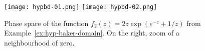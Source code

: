 \documentclass[a4paper, 12pt, reqno]{amsart}
\numberwithin{equation}{section}
\newcommand{\red}[1]{{\color{red} #1}}
\theoremstyle{plain}
\theoremstyle{definition}
\theoremstyle{remark}
\newcommand{\C}{{\mathbb{C}}}
\newcommand{\N}{{\mathbb{N}}}
\begin{document}







\begin{figure}[h!]
\texttt{[image: hypbd-01.png]}
\texttt{[image: hypbd-02.png]}
\caption[Phase space of a transcendental self-map of $\C^*$ which has a hyperbolic Baker domain]{Phase space of the function $f_2(z)=2z\exp(e^{-z}+1/z)$ from Example~\ref{ex:hyp-baker-domain}. On the right, zoom of a neighbourhood of zero.}
\label{fig:hyp-baker-domain}
\end{figure}
\end{document}
